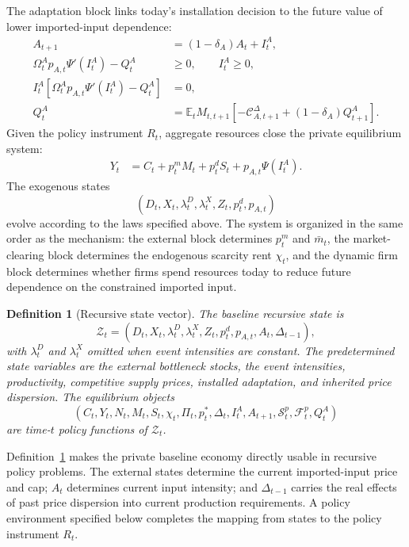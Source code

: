 ﻿\documentclass[12pt]{article}
\newtheorem{definition}{Definition}
\theoremstyle{remark}
\newcommand{\E}{\mathbb E}
\newcommand{\C}{\mathcal C}
\begin{document}
The adaptation block links today's installation decision to the future value of lower
imported-input dependence:
\begin{align}
    A_{t+1}
    &=
    (1-\delta_A)A_t+I_t^A,
    \label{eq:system_A_law}\\
    \Omega_t^Ap_{A,t}\Psi'(I_t^A)-Q_t^A&\ge0,
    \qquad
    I_t^A\ge0,
    \label{eq:system_adaptation_kkt_1}\\
    I_t^A[\Omega_t^Ap_{A,t}\Psi'(I_t^A)-Q_t^A]&=0,
    \label{eq:system_adaptation_kkt}\\
    Q_t^A
    &=
    \E_tM_{t,t+1}
    [-\C_{A,t+1}^{\Delta}+(1-\delta_A)Q_{t+1}^A].
    \label{eq:system_Q}
\end{align}
Given the policy instrument $R_t$, aggregate resources close the private equilibrium system:
\begin{align}
    Y_t
    &=
    C_t+p_t^mM_t+p_t^dS_t
    +
    p_{A,t}\Psi(I_t^A).
    \label{eq:system_resource}
\end{align}
The exogenous states
\[
    (D_t,X_t,\lambda_t^D,\lambda_t^X,Z_t,p_t^d,p_{A,t})
\]
evolve according to the laws specified above. The system is organized in the same order as the
mechanism: the external block determines $p_t^m$ and $\bar m_t$, the market-clearing block
determines the endogenous scarcity rent $\chi_t$, and the dynamic firm block determines whether
firms spend resources today to reduce future dependence on the constrained imported input.

\begin{definition}[Recursive state vector]\label{def:recursive_state}
The baseline recursive state is
\begin{equation}
    \mathcal Z_t
    =
    (D_t,X_t,\lambda_t^D,\lambda_t^X,Z_t,p_t^d,p_{A,t},A_t,\Delta_{t-1}),
    \label{eq:recursive_state}
\end{equation}
with $\lambda_t^D$ and $\lambda_t^X$ omitted when event intensities are constant. The predetermined
state variables are the external bottleneck stocks, the event intensities, productivity, competitive
supply prices, installed adaptation, and inherited price dispersion. The equilibrium objects
\[
    (C_t,Y_t,N_t,M_t,S_t,\chi_t,\Pi_t,p_t^*,\Delta_t,I_t^A,A_{t+1},
    \mathcal S_t^p,\mathcal F_t^p,Q_t^A)
\]
are time-$t$ policy functions of $\mathcal Z_t$.
\end{definition}

Definition~\ref{def:recursive_state} makes the private baseline economy directly usable in
recursive policy problems. The external states determine the current imported-input price and cap;
$A_t$ determines current input intensity; and $\Delta_{t-1}$ carries the real effects of past price
dispersion into current production requirements. A policy environment specified below completes
the mapping from states to the policy instrument $R_t$.
\end{document}
